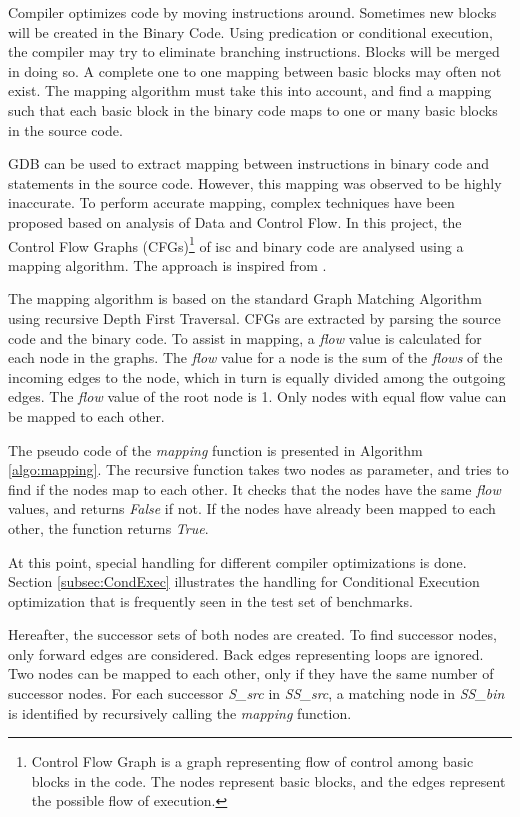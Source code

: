 Compiler optimizes code by moving instructions around. Sometimes new blocks will be created in the Binary Code. Using predication or conditional execution, the compiler may try to eliminate branching instructions. Blocks will be merged in doing so. A complete one to one mapping between basic blocks may often not exist. The mapping algorithm must take this into account, and find a mapping such that each basic block in the binary code maps to one or many basic blocks in the source code.

GDB can be used to extract mapping between instructions in binary code and statements in the source code. However, this mapping was observed to be highly inaccurate. To perform accurate mapping, complex techniques have been proposed based on analysis of Data and Control Flow. In this project, the Control Flow Graphs (CFGs)\footnote{Control Flow Graph is a graph representing flow of control among basic blocks in the code. The nodes represent basic blocks, and the edges represent the possible flow of execution.} of \gls{isc} and binary code are analysed using a mapping algorithm. The approach is inspired from \cite{RBA2013}.

The mapping algorithm is based on the standard Graph Matching Algorithm using recursive Depth First Traversal. CFGs are extracted by parsing the source code and the binary code. To assist in mapping, a \textit{flow} value is calculated for each node in the graphs. The \textit{flow} value for a node is the sum of the \textit{flows} of the incoming edges to the node, which in turn is equally divided among the outgoing edges. The \textit{flow} value of the root node is 1. Only nodes with equal flow value can be mapped to each other.

The pseudo code of the \emph{mapping} function is presented in Algorithm \ref{algo:mapping}. The recursive function takes two nodes as parameter, and tries to find if the nodes map to each other. It checks that the nodes have the same \textit{flow} values, and returns \textit{False} if not. If the nodes have already been mapped to each other, the function returns \textit{True}. 

At this point, special handling for different compiler optimizations is done. Section \ref{subsec:CondExec} illustrates the handling for Conditional Execution optimization that is frequently seen in the test set of benchmarks.

Hereafter, the successor sets of both nodes are created. To find successor nodes, only forward edges are considered. Back edges representing loops are ignored. Two nodes can be mapped to each other, only if they have the same number of successor nodes. For each successor \emph{S\_src} in \emph{SS\_src}, a matching node in \emph{SS\_bin} is identified by recursively calling the \emph{mapping} function. 

